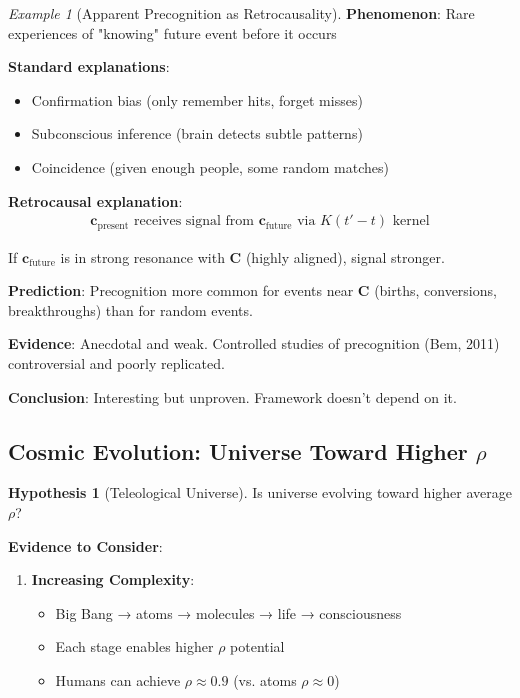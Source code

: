 \documentclass[11pt,a4paper]{article}
\theoremstyle{definition}
\newtheorem{hypothesis}{Hypothesis}[section]
\theoremstyle{remark}
\newtheorem{example}{Example}[section]
\newcommand{\cc}{\mathbf{c}}
\begin{document}
\begin{enumerate}
\begin{example}[Apparent Precognition as Retrocausality]
\textbf{Phenomenon}: Rare experiences of "knowing" future event before it occurs

\textbf{Standard explanations}:
\begin{itemize}
    \item Confirmation bias (only remember hits, forget misses)
    \item Subconscious inference (brain detects subtle patterns)
    \item Coincidence (given enough people, some random matches)
\end{itemize}

\textbf{Retrocausal explanation}:
\begin{align}
\cc_{\text{present}} \text{ receives signal from } \cc_{\text{future}} \text{ via } K(t'-t) \text{ kernel}
\end{align}

If \(\cc_{\text{future}}\) is in strong resonance with \(\mathbf{C}\) (highly aligned), signal stronger.

\textbf{Prediction}: Precognition more common for events near \(\mathbf{C}\) (births, conversions, breakthroughs) than for random events.

\textbf{Evidence}: Anecdotal and weak. Controlled studies of precognition (Bem, 2011) controversial and poorly replicated.

\textbf{Conclusion}: Interesting but unproven. Framework doesn't depend on it.
\end{example}

\subsection{Cosmic Evolution: Universe Toward Higher \(\rho\)}

\begin{hypothesis}[Teleological Universe]
Is universe evolving toward higher average \(\rho\)?

\textbf{Evidence to Consider}:
\begin{enumerate}
    \item \textbf{Increasing Complexity}: 
        \begin{itemize}
            \item Big Bang → atoms → molecules → life → consciousness
            \item Each stage enables higher \(\rho\) potential
            \item Humans can achieve \(\rho \approx 0.9\) (vs. atoms \(\rho \approx 0\))
        \end{itemize}
    

\end{enumerate}
\end{hypothesis}
\end{enumerate}
\end{document}
